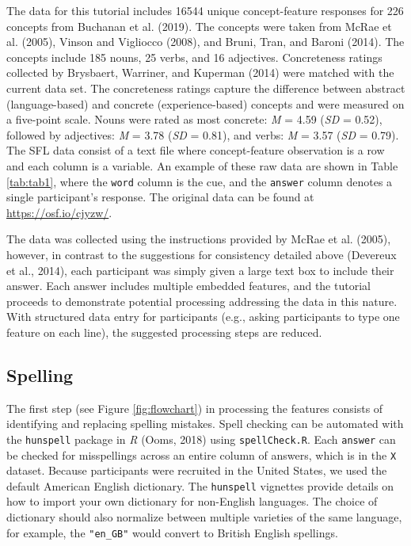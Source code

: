 \documentclass[man]{apa6}
\begin{document}
The data for this tutorial includes 16544 unique concept-feature responses for 226 concepts from Buchanan et al. (2019). The concepts were taken from McRae et al. (2005), Vinson and Vigliocco (2008), and Bruni, Tran, and Baroni (2014). The concepts include 185 nouns, 25 verbs, and 16 adjectives. Concreteness ratings collected by Brysbaert, Warriner, and Kuperman (2014) were matched with the current data set. The concreteness ratings capture the difference between abstract (language-based) and concrete (experience-based) concepts and were measured on a five-point scale. Nouns were rated as most concrete: \emph{M} = 4.59 (\emph{SD} = 0.52), followed by adjectives: \emph{M} = 3.78 (\emph{SD} = 0.81), and verbs: \emph{M} = 3.57 (\emph{SD} = 0.79). The SFL data consist of a text file where concept-feature observation is a row and each column is a variable. An example of these raw data are shown in Table \ref{tab:tab1}, where the \texttt{word} column is the cue, and the \texttt{answer} column denotes a single participant's response. The original data can be found at \url{https://osf.io/cjyzw/}.

The data was collected using the instructions provided by McRae et al. (2005), however, in contrast to the suggestions for consistency detailed above (Devereux et al., 2014), each participant was simply given a large text box to include their answer. Each answer includes multiple embedded features, and the tutorial proceeds to demonstrate potential processing addressing the data in this nature. With structured data entry for participants (e.g., asking participants to type one feature on each line), the suggested processing steps are reduced.

\hypertarget{spelling}{%
\subsection{Spelling}\label{spelling}}

The first step (see Figure \ref{fig:flowchart}) in processing the features consists of identifying and replacing spelling mistakes. Spell checking can be automated with the \texttt{hunspell} package in \emph{R} (Ooms, 2018) using \texttt{spellCheck.R}. Each \texttt{answer} can be checked for misspellings across an entire column of answers, which is in the \texttt{X} dataset. Because participants were recruited in the United States, we used the default American English dictionary. The \texttt{hunspell} vignettes provide details on how to import your own dictionary for non-English languages. The choice of dictionary should also normalize between multiple varieties of the same language, for example, the \texttt{"en\_GB"} would convert to British English spellings.
\end{document}
